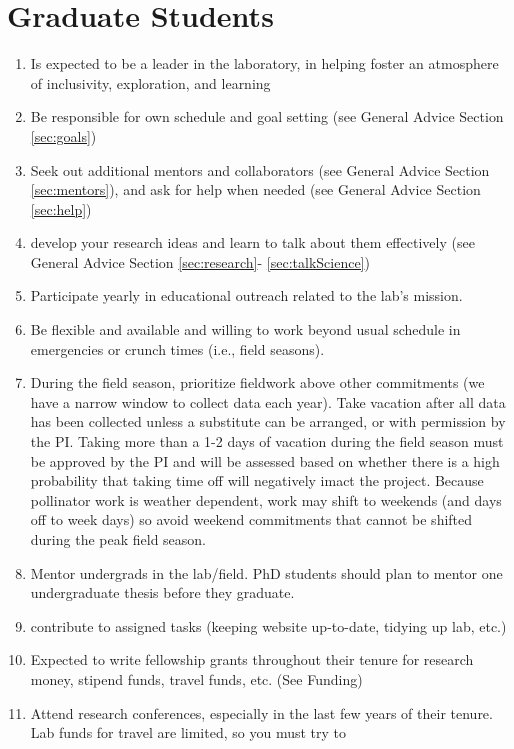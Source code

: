 \documentclass[12pt]{article}
\begin{document}
\section{Graduate Students}
\begin{enumerate}
\item Is expected to be a leader in the laboratory, in helping foster
  an atmosphere of inclusivity, exploration, and  learning
\item Be responsible for own schedule and goal setting (see General Advice
  Section \ref{sec:goals})
\item Seek out additional mentors and collaborators (see General
  Advice Section \ref{sec:mentors}), and ask for help when needed (see
  General Advice Section \ref{sec:help})
\item develop your research ideas and learn to talk about them
  effectively (see General Advice Section \ref{sec:research}-
  \ref{sec:talkScience})
 \item Participate yearly in educational outreach related to the lab's mission.
\item Be flexible and available and willing to work beyond usual
  schedule in emergencies or crunch times (i.e., field seasons).
\item During the field season, prioritize fieldwork above other
  commitments (we have a narrow window to collect data each
  year). Take vacation after all data has been collected unless a
  substitute can be arranged, or with permission by the PI. Taking
  more than a 1-2 days of vacation during the field season must be
  approved by the PI and will be assessed based on whether there is a
  high probability that taking time off will negatively imact the
  project. Because pollinator work is weather dependent, work may
  shift to weekends (and days off to week days) so avoid weekend
  commitments that cannot be shifted during the peak field season.
\item Mentor undergrads in the lab/field. PhD students should plan to
  mentor one undergraduate thesis before they graduate.
\item contribute to assigned tasks (keeping website up-to-date,
  tidying up lab, etc.)
\item Expected to write fellowship grants throughout their tenure for
  research money, stipend funds, travel funds, etc. (See Funding)
\item Attend research conferences, especially in the last few years of
  their tenure. Lab funds for travel are limited, so you must try to

\end{enumerate}
\end{document}
